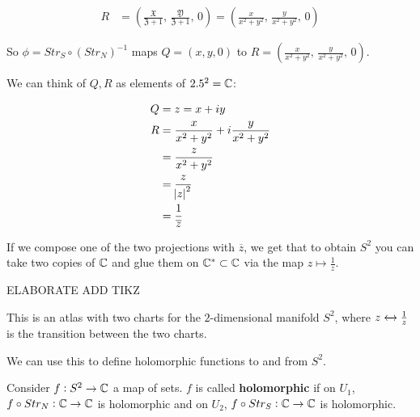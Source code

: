 \begin{align*}
    R &= \left( \frac{\mathfrak{X}}{\mathfrak{Z} + 1} , \, \frac{\mathfrak{Y}}{\mathfrak{Z}+1} , \, 0 \right) = \left( \frac{x}{x^2+y^2} , \, \frac{y}{x^2+y^2} , \, 0         \right)
\end{align*}


So $\phi = Str_S \circ (Str_N)^{-1}$ maps $Q = (x,y,0)$ to $R = \left( \frac{x}{x^2+y^2} , \, \frac{y}{x^2+y^2} , \, 0         \right)$.

We can think of $Q,R$ as elements of $2.5^2 = \mathbb{C}$:

\begin{align*}
    Q &= z = x+iy\\
    R &= \frac{x}{x^2 + y^2} + i \frac{y}{x^2 + y^2}\\
    &= \frac{z}{x^2 + y^2}\\
    &= \frac{z}{\abs{z}^2}\\ &= \frac{1}{\overline{z}}
\end{align*}



If we compose one of the two projections with $\overline{z}$, we get that to obtain $S^2$ you can take two copies of $\mathbb{C}$ and glue them on $\mathbb{C}^* \subset \mathbb{C}$ via the map $z \mapsto \frac{1}{z}$.

ELABORATE
ADD TIKZ

\begin{remark}

This is an atlas with two charts for the $2$-dimensional  manifold $S^2$, where $z \xleftrightarrow[]{} \frac{1}{z}$ is the transition between the two charts.
\end{remark}


We can use this to define holomorphic functions to and from $S^2$.


\begin{definition}

Consider $f: S^2 \to \mathbb{C}$ a map of sets. $f$ is called \textbf{holomorphic} if on $U_1$, $f \circ Str_N: \mathbb{C} \to \mathbb{C}$ is holomorphic and on $U_2$, $f \circ Str_S: \mathbb{C} \to \mathbb{C}$ is holomorphic.
\end{definition}


























